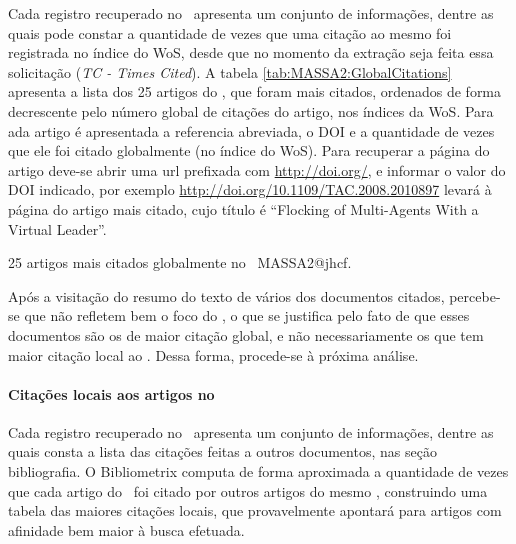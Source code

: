 Cada registro recuperado no \dataset\ apresenta um conjunto de informações, dentre as quais pode constar a quantidade de vezes que uma citação ao mesmo foi registrada no índice do WoS, desde que no momento da extração seja feita essa solicitação (\textit{TC - Times Cited}).
A tabela \ref{tab:MASSA2:GlobalCitations} apresenta a lista dos 25 artigos do \dataset, que foram mais citados, ordenados de forma decrescente pelo número global de citações do artigo, nos índices da WoS. Para ada artigo é apresentada a referencia abreviada, o DOI e a quantidade de vezes que ele foi citado globalmente (no índice do WoS). Para recuperar a página do artigo deve-se abrir uma url prefixada com \url{http://doi.org/}, e informar o valor do DOI indicado, por exemplo \url{http://doi.org/10.1109/TAC.2008.2010897} levará à página do artigo mais citado, cujo título é ``Flocking of Multi-Agents With a Virtual Leader''.

\begin{table}[htp]
    \centering
\footnotesize
{}

    \caption{25 artigos mais citados globalmente no \dataset\ MASSA2@jhcf.}
    \label{tab:MASSA2:GlobalCitations}
\end{table}

Após a visitação do resumo do texto de vários dos documentos citados, percebe-se que não refletem bem o foco do \dataset, o que se justifica pelo fato de que esses documentos são os de maior citação global, e não necessariamente os que tem maior citação local ao \dataset. Dessa forma, procede-se à próxima análise.

\paragraph{Citações locais aos artigos no \dataset}

Cada registro recuperado no \dataset\ apresenta um conjunto de informações, dentre as quais consta a lista das citações feitas a outros documentos, nas seção bibliografia. O Bibliometrix computa de forma aproximada a quantidade de vezes que cada artigo do \dataset\ foi citado por outros artigos do mesmo \dataset, construindo uma tabela das maiores citações locais, que provavelmente apontará para artigos com afinidade bem maior à busca efetuada.

